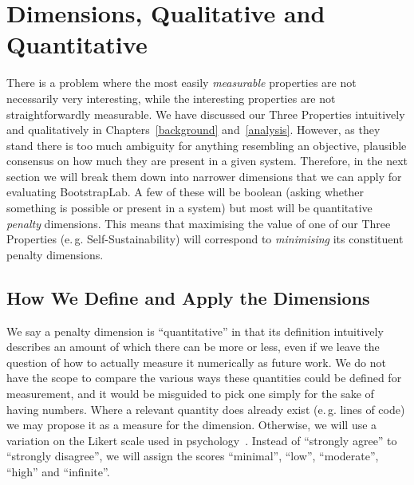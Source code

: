 \documentclass[ twoside,openright,titlepage,numbers=noenddot,headinclude,footinclude,cleardoublepage=empty,abstract=on,
                BCOR=5mm,paper=a4,fontsize=11pt
                ]{scrreprt}
\newcommand{\eg}{e.\,g.}
\theoremstyle{definition}
\begin{document}
\hypertarget{dimensions-qualitative-and-quantitative}{\section{Dimensions, Qualitative and
Quantitative}\label{dimensions-qualitative-and-quantitative}}

There is a problem where the most easily \emph{measurable} properties
are not necessarily very interesting, while the interesting properties
are not straightforwardly measurable. We have discussed our Three
Properties intuitively and qualitatively in Chapters~\ref{background}
and~\ref{analysis}. However, as they stand there is too much ambiguity
for anything resembling an objective, plausible consensus on how much
they are present in a given system. Therefore, in the next section we
will break them down into narrower dimensions that we can apply for
evaluating BootstrapLab. A few of these will be boolean (asking whether
something is possible or present in a system) but most will be
quantitative \emph{penalty} dimensions. This means that maximising the
value of one of our Three Properties (\eg{} Self-Sustainability) will
correspond to \emph{minimising} its constituent penalty dimensions.

\hypertarget{how-we-define-and-apply-the-dimensions}{\subsection{How We Define and Apply the
Dimensions}\label{how-we-define-and-apply-the-dimensions}}

We say a penalty dimension is ``quantitative'' in that its definition
intuitively describes an amount of which there can be more or less, even
if we leave the question of how to actually measure it numerically as
future work. We do not have the scope to compare the various ways these
quantities could be defined for measurement, and it would be misguided
to pick one simply for the sake of having numbers. Where a relevant
quantity does already exist (\eg{} lines of code) we may propose it as a
measure for the dimension. Otherwise, we will use a variation on the
Likert scale used in psychology~\parencite{Likert}. Instead of
``strongly agree'' to ``strongly disagree'', we will assign the scores
``minimal'', ``low'', ``moderate'', ``high'' and ``infinite''.
\end{document}
